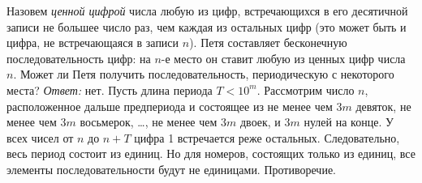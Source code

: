 \problem
Назовем \emph{ценной цифрой} числа любую из цифр, встречающихся в его
десятичной записи не большее число раз, чем каждая из остальных цифр
(это может быть и цифра, не встречающаяся в записи $n$).
Петя составляет бесконечную последовательность цифр: на $n$-е место он ставит
любую из ценных цифр числа $n$.
Может ли Петя получить последовательность, периодическую с некоторого места?
\solution
\emph{Ответ:} нет.
Пусть длина периода $T < 10^m$.
Рассмотрим число $n$, расположенное дальше предпериода и состоящее из не менее
чем $3m$ девяток, не менее чем $3m$ восьмерок, \ldots, не менее чем $3m$ двоек,
и $3m$ нулей на конце.
У всех чисел от $n$ до  $n + T$ цифра 1 встречается реже остальных.
Следовательно, весь период состоит из единиц.
Но для номеров, состоящих только из единиц, все элементы последовательности
будут не единицами.
Противоречие.
\endproblem
